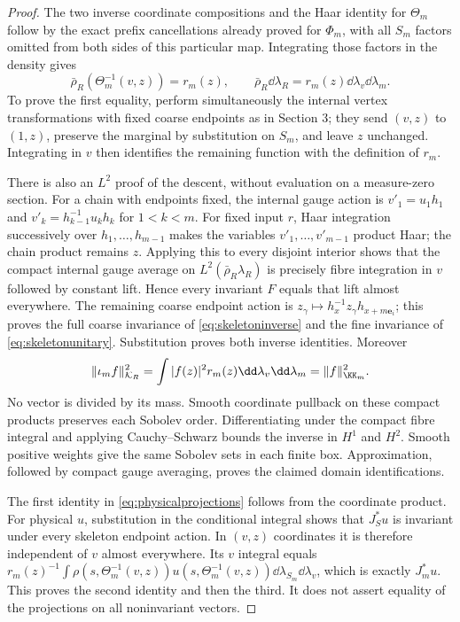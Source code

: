 \begin{proof}
The two inverse coordinate compositions and the Haar identity for
$\Theta_m$ follow by the exact prefix cancellations already proved
for $\Phi_m$, with all $S_m$ factors omitted from both sides of
this particular map. Integrating those factors in the density gives
\[
 \bar\rho_R(\Theta_m^{-1}(v,z))=r_m(z),\qquad
 \bar\rho_R\dd\lambda_R=r_m(z)\dd\lambda_v\dd\lambda_m.
\]
To prove the first equality, perform simultaneously the internal
vertex transformations with fixed coarse endpoints as in Section 3;
they send $(v,z)$ to $(1,z)$, preserve the marginal by substitution
on $S_m$, and leave $z$ unchanged. Integrating in $v$ then identifies
the remaining function with the definition of $r_m$.

There is also an $L^2$ proof of the descent, without evaluation on
a measure-zero section. For a chain with endpoints fixed, the
internal gauge action is
$v'_1=u_1h_1$ and $v'_k=h_{k-1}^{-1}u_kh_k$ for $1<k<m$.
For fixed input $r$, Haar integration successively over
$h_1,\ldots,h_{m-1}$ makes the variables $v'_1,\ldots,v'_{m-1}$
product Haar; the chain product remains $z$. Applying this to every
disjoint interior shows that the compact internal gauge average on
$L^2(\bar\rho_R\lambda_R)$ is precisely fibre integration in $v$
followed by constant lift. Hence every invariant $F$ equals that
lift almost everywhere. The remaining coarse endpoint action is
$z_\gamma\mapsto h_x^{-1}z_\gamma h_{x+m\mathbf e_i}$; this proves
the full coarse invariance of \eqref{eq:skeletoninverse} and the
fine invariance of \eqref{eq:skeletonunitary}. Substitution proves
both inverse identities. Moreover
\[
 \|\iota_m f\|_{\mathcal K_R}^2
 =\int |f(z)|^2r_m(z)\dd\lambda_v\dd\lambda_m
 =\|f\|_{\KK_m}^2.
\]
No vector is divided by its mass. Smooth coordinate pullback on
these compact products preserves each Sobolev order. Differentiating
under the compact fibre integral and applying Cauchy--Schwarz bounds
the inverse in $H^1$ and $H^2$. Smooth positive weights give the
same Sobolev sets in each finite box. Approximation, followed by
compact gauge averaging, proves the claimed domain identifications.

The first identity in \eqref{eq:physicalprojections} follows from
the coordinate product. For physical $u$, substitution in the
conditional integral shows that $J_S^*u$ is invariant under every
skeleton endpoint action. In $(v,z)$ coordinates it is therefore
independent of $v$ almost everywhere. Its $v$ integral equals
$r_m(z)^{-1}\int\rho(s,\Theta_m^{-1}(v,z))
u(s,\Theta_m^{-1}(v,z))\dd\lambda_{S_m}\dd\lambda_v$,
which is exactly $J_m^*u$. This proves the second identity and then
the third. It does not assert equality of the projections on all
noninvariant vectors.


\end{proof}
